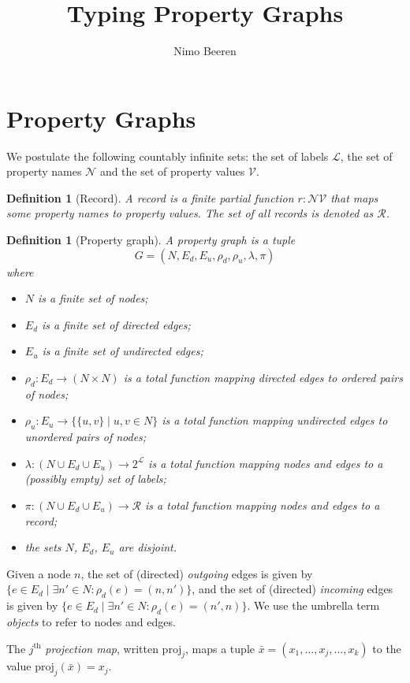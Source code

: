\documentclass[a4paper]{article}
\title{Typing Property Graphs}
\author{Nimo Beeren}
\makeatletter
\newtheorem{definition}[theorem]{Definition}
\newcommand{\pto}{}%
\DeclareRobustCommand{\pto}{\mathrel{\mathpalette\p@to@gets\to}}
\newcommand{\p@to@gets}[2]{%
  \ooalign{\hidewidth$\m@th#1\mapstochar\mkern5mu$\hidewidth\cr$\m@th#1\to$\cr}%
}
\newcommand{\proj}{\mathrm{proj}}
\makeatother
\begin{document}
\section{Property Graphs}

We postulate the following countably infinite sets: the set of labels $\mathcal{L}$, the set of property names $\mathcal{N}$ and the set of property values $\mathcal{V}$.

\begin{definition}[Record]
  A \emph{record} is a finite partial function $r : \mathcal{N} \pto \mathcal{V}$ that maps some property names to property values. The set of all records is denoted as $\mathcal{R}$.
\end{definition}

\begin{definition}[Property graph]
  A \emph{property graph} is a tuple \[G = (N, E_d, E_u, \rho_d, \rho_u, \lambda, \pi)\] where
  \begin{itemize}
    \item $N$ is a finite set of nodes;
    \item $E_d$ is a finite set of directed edges;
    \item $E_u$ is a finite set of undirected edges;
    \item $\rho_d : E_d \to (N \times N)$ is a total function mapping directed edges to ordered pairs of nodes;
    \item $\rho_u : E_u \to \{\{u, v\} \mid u, v \in N\}$ is a total function mapping undirected edges to unordered pairs of nodes;
    \item $\lambda : (N \cup E_d \cup E_u) \to 2^{\mathcal{L}}$ is a total function mapping nodes and edges to a (possibly empty) set of labels;
    \item $\pi : (N \cup E_d \cup E_u) \to \mathcal{R}$ is a total function mapping nodes and edges to a record;
    \item the sets $N$, $E_d$, $E_u$ are disjoint.
  \end{itemize}
\end{definition}

Given a node $n$, the set of (directed) \emph{outgoing} edges is given by $\{e \in E_d \mid \exists n' \in N : \rho_d(e) = (n, n')\}$, and the set of (directed) \emph{incoming} edges is given by $\{e \in E_d \mid \exists n' \in N : \rho_d(e) = (n', n)\}$. We use the umbrella term \emph{objects} to refer to nodes and edges.

The $j^\text{th}$ \emph{projection map}, written $\proj_j$, maps a tuple $\bar{x} = (x_1, \ldots, x_j, \ldots, x_k)$ to the value $\proj_j(\bar{x}) = x_j$.
\end{document}
